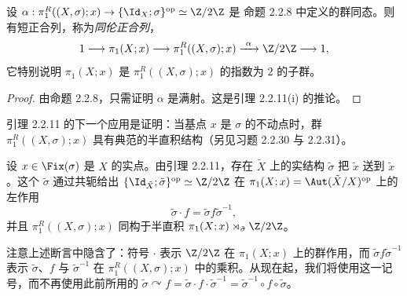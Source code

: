 \begin{proposition}\label{prop:2.2.12}
设 $\alpha:\pi^R_1((X,\sigma);x)\to\{\Id_X;\sigma\}^{\mathrm{op}}\simeq\Z/2\Z$ 是
命题 2.2.8 中定义的群同态。则有短正合列，称为\emph{同伦正合列}，
\begin{equation}\label{eq:2.17}
1\longrightarrow\pi_1(X;x)\longrightarrow\pi^R_1((X,\sigma);x)
\xrightarrow{\ \alpha\ }\Z/2\Z\longrightarrow1,
\end{equation}
它特别说明 $\pi_1(X;x)$ 是 $\pi^R_1((X,\sigma);x)$ 的指数为 $2$ 的子群。
\end{proposition}

\begin{proof}
由命题 2.2.8，只需证明 $\alpha$ 是满射。这是引理 2.2.11(i) 的推论。
\end{proof}

引理 2.2.11 的下一个应用是证明：当基点 $x$ 是 $\sigma$ 的不动点时，群
$\pi^R_1((X,\sigma);x)$ 具有典范的半直积结构（另见习题 2.2.30 与 2.2.31）。

\begin{proposition}\label{prop:2.2.13}
设 $x\in\Fix(\sigma)$ 是 $X$ 的实点。由引理 2.2.11，存在 $\tilde X$ 上的实结构
$\tilde\sigma$ 把 $\tilde x$ 送到 $\tilde x$。这个 $\tilde\sigma$ 通过共轭给出
$\{\Id_{\tilde X};\tilde\sigma\}^{\mathrm{op}}\simeq\Z/2\Z$ 在
$\pi_1(X;x)=\Aut(\tilde X/X)^{\mathrm{op}}$ 上的左作用
\begin{equation}\label{eq:2.18}
\tilde\sigma\cdot f=\tilde\sigma f\tilde\sigma^{-1},
\end{equation}
并且 $\pi^R_1((X,\sigma);x)$ 同构于半直积
$\pi_1(X;x)\rtimes_{\tilde\sigma}\Z/2\Z$。
\end{proposition}

注意上述断言中隐含了：符号 $\cdot$ 表示 $\Z/2\Z$ 在 $\pi_1(X;x)$ 上的群作用，而
$\tilde\sigma f\tilde\sigma^{-1}$ 表示 $\tilde\sigma$、$f$ 与 $\tilde\sigma^{-1}$ 在
$\pi^R_1((X,\sigma);x)$ 中的乘积。从现在起，我们将使用这一记号，而不再使用此前所用的
$\tilde\sigma\curvearrowright f=\tilde\sigma\cdot f\cdot\tilde\sigma^{-1}
=\tilde\sigma^{-1}\circ f\circ\tilde\sigma$。

